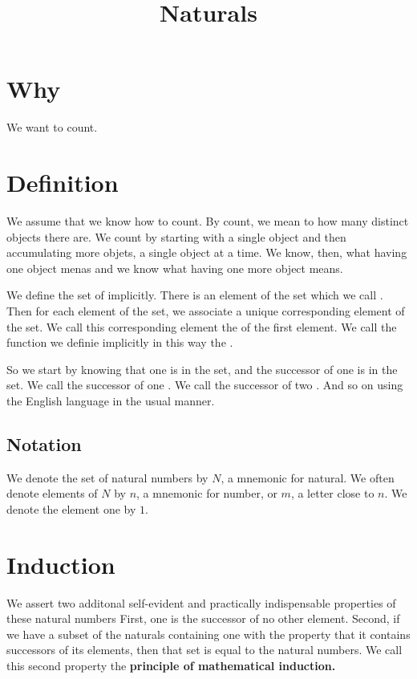 






\title{Naturals}

\section{Why}

We want to count.

\section{Definition}

We assume that we know how to count.
By count, we mean to how many distinct objects there are.
We count by starting with a single object and then accumulating more objets, a single object at a time.
We know, then, what having one object menas and we know what having one more object means.


We define the set of  implicitly.
There is an element of the set which we call .
Then for each element of the set, we associate a unique corresponding element of the set.
We call this corresponding element the  of the first element.
We call the function we definie implicitly in this way the .

So we start by knowing that one is in the set, and the successor of one is in the set.
We call the successor of one .
We call the successor of two .
And so on using the English language in the usual manner.


\subsection{Notation}

We denote the set of natural numbers by $N$, a mnemonic for natural.
We often denote elements of $N$ by $n$, a mnemonic for number, or $m$, a letter close to $n$.
We denote the element one by $1$.

\section{Induction}

We assert two additonal self-evident and practically indispensable properties of these natural numbers
First, one is the successor of no other element.
Second, if we have a subset of the naturals containing one with the property that it contains successors of its elements, then that set is equal to the natural numbers.
We call this second property the \textbf{principle of mathematical induction.}

